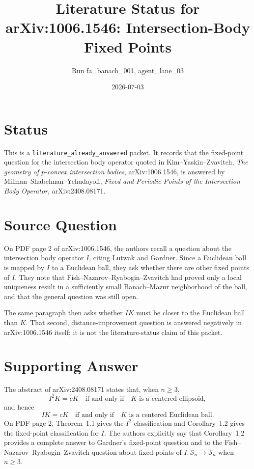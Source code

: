\documentclass[11pt]{article}
\title{Literature Status for arXiv:1006.1546: Intersection-Body Fixed Points}
\author{Run fa\_banach\_001, agent\_lane\_03}
\date{2026-07-03}
\begin{document}
\maketitle

\section*{Status}

This is a \texttt{literature\_already\_answered} packet.  It records that the
fixed-point question for the intersection body operator quoted in
Kim--Yaskin--Zvavitch, \emph{The geometry of \(p\)-convex intersection
bodies}, arXiv:1006.1546, is answered by Milman--Shabelman--Yehudayoff,
\emph{Fixed and Periodic Points of the Intersection Body Operator},
arXiv:2408.08171.

\section*{Source Question}

On PDF page 2 of arXiv:1006.1546, the authors recall a question about the
intersection body operator \(I\), citing Lutwak and Gardner.  Since a Euclidean
ball is mapped by \(I\) to a Euclidean ball, they ask whether there are other
fixed points of \(I\).  They note that Fish--Nazarov--Ryabogin--Zvavitch had
proved only a local uniqueness result in a sufficiently small Banach--Mazur
neighborhood of the ball, and that the general question was still open.

The same paragraph then asks whether \(IK\) must be closer to the Euclidean
ball than \(K\).  That second, distance-improvement question is answered
negatively in arXiv:1006.1546 itself; it is not the literature-status claim of
this packet.

\section*{Supporting Answer}

The abstract of arXiv:2408.08171 states that, when \(n\geq 3\),
\[
  I^2K=cK \quad\text{if and only if}\quad K
  \text{ is a centered ellipsoid},
\]
and hence
\[
  IK=cK \quad\text{if and only if}\quad K
  \text{ is a centered Euclidean ball}.
\]
On PDF page 2, Theorem~1.1 gives the \(I^2\) classification and
Corollary~1.2 gives the fixed-point classification for \(I\).  The authors
explicitly say that Corollary~1.2 provides a complete answer to Gardner's
fixed-point question and to the Fish--Nazarov--Ryabogin--Zvavitch question
about fixed points of \(I:\mathcal S_n\to\mathcal S_n\) when \(n\geq 3\).
\end{document}
